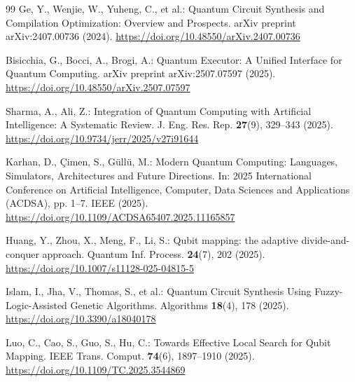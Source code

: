 \begin{thebibliography}{99}
Ge, Y., Wenjie, W., Yuheng, C., et al.: Quantum Circuit Synthesis and Compilation Optimization: Overview and Prospects. arXiv preprint arXiv:2407.00736 (2024). \url{https://doi.org/10.48550/arXiv.2407.00736}

Bisicchia, G., Bocci, A., Brogi, A.: Quantum Executor: A Unified Interface for Quantum Computing. arXiv preprint arXiv:2507.07597 (2025). \url{https://doi.org/10.48550/arXiv.2507.07597}

Sharma, A., Ali, Z.: Integration of Quantum Computing with Artificial Intelligence: A Systematic Review. J. Eng. Res. Rep. \textbf{27}(9), 329--343 (2025). \url{https://doi.org/10.9734/jerr/2025/v27i91644}

Karhan, D., Çimen, S., Güllü, M.: Modern Quantum Computing: Languages, Simulators, Architectures and Future Directions. In: 2025 International Conference on Artificial Intelligence, Computer, Data Sciences and Applications (ACDSA), pp. 1--7. IEEE (2025). \url{https://doi.org/10.1109/ACDSA65407.2025.11165857}

Huang, Y., Zhou, X., Meng, F., Li, S.: Qubit mapping: the adaptive divide-and-conquer approach. Quantum Inf. Process. \textbf{24}(7), 202 (2025). \url{https://doi.org/10.1007/s11128-025-04815-5}

Islam, I., Jha, V., Thomas, S., et al.: Quantum Circuit Synthesis Using Fuzzy-Logic-Assisted Genetic Algorithms. Algorithms \textbf{18}(4), 178 (2025). \url{https://doi.org/10.3390/a18040178}

Luo, C., Cao, S., Guo, S., Hu, C.: Towards Effective Local Search for Qubit Mapping. IEEE Trans. Comput. \textbf{74}(6), 1897--1910 (2025). \url{https://doi.org/10.1109/TC.2025.3544869}

\end{thebibliography}